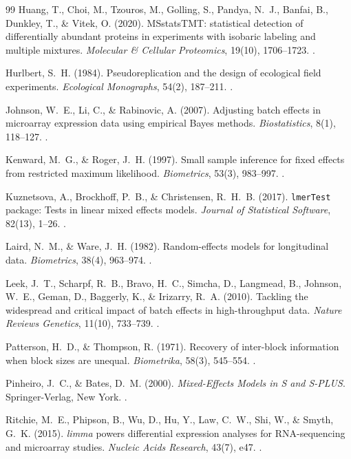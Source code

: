 \documentclass[11pt,twoside,openright]{book}
\begin{document}
\begin{thebibliography}{99}
Huang, T., Choi, M., Tzouros, M., Golling, S., Pandya, N.~J., Banfai, B., Dunkley, T., \& Vitek, O. (2020). MSstatsTMT: statistical detection of differentially abundant proteins in experiments with isobaric labeling and multiple mixtures. \textit{Molecular \& Cellular Proteomics}, 19(10), 1706--1723. .

Hurlbert, S.~H. (1984). Pseudoreplication and the design of ecological field experiments. \textit{Ecological Monographs}, 54(2), 187--211. .

Johnson, W.~E., Li, C., \& Rabinovic, A. (2007). Adjusting batch effects in microarray expression data using empirical Bayes methods. \textit{Biostatistics}, 8(1), 118--127. .

Kenward, M.~G., \& Roger, J.~H. (1997). Small sample inference for fixed effects from restricted maximum likelihood. \textit{Biometrics}, 53(3), 983--997. .

Kuznetsova, A., Brockhoff, P.~B., \& Christensen, R.~H.~B. (2017). \texttt{lmerTest} package: Tests in linear mixed effects models. \textit{Journal of Statistical Software}, 82(13), 1--26. .

Laird, N.~M., \& Ware, J.~H. (1982). Random-effects models for longitudinal data. \textit{Biometrics}, 38(4), 963--974. .

Leek, J.~T., Scharpf, R.~B., Bravo, H.~C., Simcha, D., Langmead, B., Johnson, W.~E., Geman, D., Baggerly, K., \& Irizarry, R.~A. (2010). Tackling the widespread and critical impact of batch effects in high-throughput data. \textit{Nature Reviews Genetics}, 11(10), 733--739. .

Patterson, H.~D., \& Thompson, R. (1971). Recovery of inter-block information when block sizes are unequal. \textit{Biometrika}, 58(3), 545--554. .

Pinheiro, J.~C., \& Bates, D.~M. (2000). \textit{Mixed-Effects Models in S and S-PLUS}. Springer-Verlag, New York. .

Ritchie, M.~E., Phipson, B., Wu, D., Hu, Y., Law, C.~W., Shi, W., \& Smyth, G.~K. (2015). \textit{limma} powers differential expression analyses for RNA-sequencing and microarray studies. \textit{Nucleic Acids Research}, 43(7), e47. .


\end{thebibliography}
\end{document}
